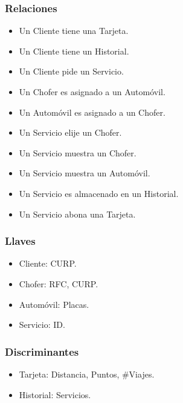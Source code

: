 \documentclass{article}
\begin{document}
       { \noindent
         \subsubsection*{Relaciones}
         \begin{multicols}{2}
           \begin{itemize}
           \item Un Cliente tiene una Tarjeta.
           \item Un Cliente tiene un Historial.
           \item Un Cliente pide un Servicio.
             
           \item Un Chofer es asignado a un Automóvil.
             
           \item Un Automóvil es asignado a un Chofer.
             
           \item Un Servicio elije un Chofer.
           \item Un Servicio muestra un Chofer.
           \item Un Servicio muestra un Automóvil.
           \item Un Servicio es almacenado en un Historial. 
           \item Un Servicio abona una Tarjeta.        
           \end{itemize}
         \end{multicols}
       }
       
       { \noindent
         \subsubsection*{Llaves}
         \begin{multicols}{2}
           \begin{itemize}
           \item Cliente: CURP.
           \item Chofer: RFC, CURP.
           \item Automóvil: Placas.
           \item Servicio: ID.
           \end{itemize}
         \end{multicols}
       }
       
       { \noindent
         \subsubsection*{Discriminantes}
         \begin{multicols}{2}
           \begin{itemize}
           \item Tarjeta: Distancia, Puntos, #Viajes.
           \item Historial: Servicios.
           \end{itemize}
         \end{multicols}
       }
       
\end{document}
